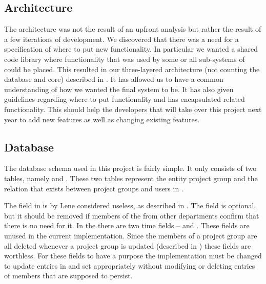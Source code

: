 \subsection{Architecture}



The architecture was not the result of an upfront analysis but rather the result of a few iterations of development.
We discovered that there was a need for a specification of where to put new functionality.
In particular we wanted a shared code library where functionality that was used by some or all sub-systems of \system{} could be placed.
This resulted in our three-layered architecture (not counting the database and \moodle{} core) described in .
It has allowed us to have a common understanding of how we wanted the final system to be.
It has also given guidelines regarding where to put functionality and has encapsulated related functionality.
This should help the developers that will take over this project next year to add new features as well as changing existing features.



\subsection{Database}
The database schema used in this project is fairly simple.
It only consists of two tables, namely   and . 
These two tables represent the entity project group and the relation that exists between project groups and users in \moodle{}. 

The  field in  is by Lene considered useless, as described in . 
The field is optional, but it should be removed if members of the \admpers{} from other departments confirm that there is no need for it. 
In the  there are two time fields --  and . 
These fields are unused in the current implementation. 
Since the members of a project group are all deleted whenever a project group is updated (described in ) these fields are worthless.
For these fields to have a purpose the implementation must be changed to update entries in  and set  appropriately without modifying  or deleting entries of members that are supposed to persist.


